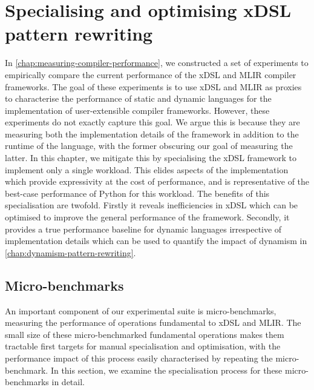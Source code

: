 \chapter{Specialising and optimising xDSL pattern rewriting}
\label{chap:specialising-optimising-pattern-rewriting}

In \autoref{chap:measuring-compiler-performance}, we constructed a set of experiments to empirically compare the current performance of the xDSL and MLIR compiler frameworks.
The goal of these experiments is to use xDSL and MLIR as proxies to characterise the performance of static and dynamic languages for the implementation of user-extensible compiler frameworks.
However, these experiments do not exactly capture this goal. We argue this is because they are measuring both the implementation details of the framework in addition to the runtime of the language, with the former obscuring our goal of measuring the latter.
In this chapter, we mitigate this by specialising the xDSL framework to implement only a single workload. This elides aspects of the implementation which provide expressivity at the cost of performance, and is representative of the best-case performance of Python for this workload.
The benefits of this specialisation are twofold. Firstly it reveals inefficiencies in xDSL which can be optimised to improve the general performance of the framework. Secondly, it provides a true performance baseline for dynamic languages irrespective of implementation details which can be used to quantify the impact of dynamism in \autoref{chap:dynamism-pattern-rewriting}.



\section{Micro-benchmarks}
\label{sec:specialising-ubenchmarks}

An important component of our experimental suite is micro-benchmarks, measuring the performance of operations fundamental to xDSL and MLIR.
The small size of these micro-benchmarked fundamental operations makes them tractable first targets for manual specialisation and optimisation, with the performance impact of this process easily characterised by repeating the micro-benchmark.
In this section, we examine the specialisation process for these micro-benchmarks in detail. %


